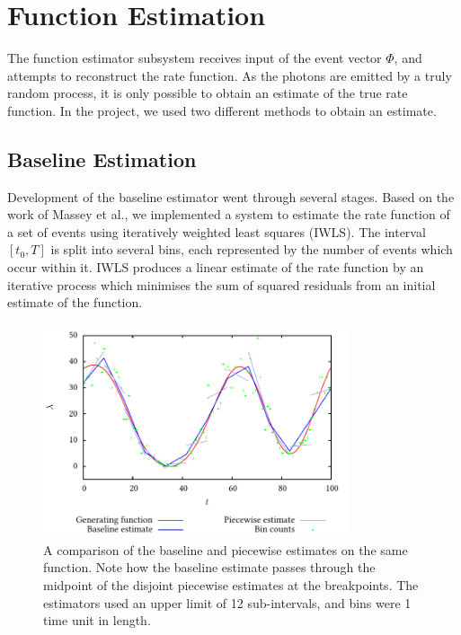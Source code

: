 \documentclass[a4paper,11pt]{article}
\begin{document}
\section{Function Estimation}
\label{sec-3}

  The function estimator subsystem receives input of the event vector $\Phi$, and
  attempts to reconstruct the rate function. As the photons are emitted by a
  truly random process, it is only possible to obtain an estimate of the true
  rate function. In the project, we used two different methods to obtain an
  estimate.
\subsection{Baseline Estimation}
\label{sec-3-1}

   Development of the baseline estimator went through several stages. Based on
   the work of Massey et al.\cite{massey}, we implemented a system to estimate
   the rate function of a set of events using iteratively weighted least squares
   (IWLS). The interval $[t_0,T]$ is split into several bins, each represented
   by the number of events which occur within it. IWLS produces a linear
   estimate of the rate function by an iterative process which minimises the sum
   of squared residuals from an initial estimate of the function.

    \begin{figure}[]
    \centering
    \includegraphics[width=0.8\textwidth]{images/pcbase}

    \caption{A comparison of the baseline and piecewise estimates on the same
    function. Note how the baseline estimate passes through the midpoint of the
    disjoint piecewise estimates at the breakpoints. The estimators used an
    upper limit of 12 sub-intervals, and bins were 1 time unit in length.}

    \label{fig:basecomp}
    \end{figure}
\end{document}
